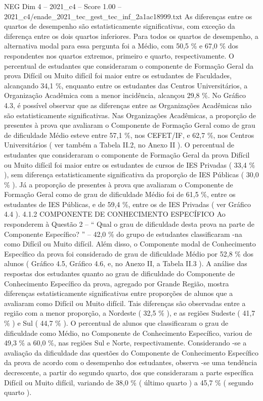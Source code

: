 \begin{textsample}{NEG Dim 4 – 2021\_c4 – Score 1.00 – 2021\_c4/enade\_2021\_tec\_gest\_tec\_inf\_2a1ac18999.txt}
As diferenças entre os quartos de desempenho são estatisticamente significativas, com exceção da diferença entre os dois quartos inferiores.
Para todos os quartos de desempenho, a alternativa modal para essa pergunta foi a Médio, com 50,5 \% e 67,0 \% dos respondentes nos quartos extremos, primeiro e quarto, respectivamente.
O percentual de estudantes que consideraram o componente de Formação Geral da prova Difícil ou Muito difícil foi maior entre os estudantes de Faculdades, alcançando 34,1 \%, enquanto entre os estudantes das Centros Universitários, a Organização Acadêmica com a menor incidência, alcançou 29,8 \%.
No Gráfico 4.3, é possível observar que as diferenças entre as Organizações Acadêmicas não são estatisticamente significativas.
Nas Organizações Acadêmicas, a proporção de presentes à prova que avaliaram o Componente de Formação Geral como de grau de dificuldade Médio esteve entre 57,1 \%, nos CEFET/IF, e 62,7 \%, nos Centros Universitários ( ver também a Tabela II.2, no Anexo II ).
O percentual de estudantes que consideraram o componente de Formação Geral da prova Difícil ou Muito difícil foi maior entre os estudantes de cursos de IES Privadas ( 33,4 \% ), sem diferença estatisticamente significativa da proporção de IES Públicas ( 30,0 \% ).
Já a proporção de presentes à prova que avaliaram o Componente de Formação Geral como de grau de dificuldade Médio foi de 61,5 \%, entre os estudantes de IES Públicas, e de 59,4 \%, entre os de IES Privadas ( ver Gráfico 4.4 ). 4.1.2 COMPONENTE DE CONHECIMENTO ESPECÍFICO Ao responderem à Questão 2 – “ Qual o grau de dificuldade desta prova na parte de Componente Específico? ” – 42,0 \% do grupo de estudantes classificaram -na como Difícil ou Muito difícil.
Além disso, o Componente modal de Conhecimento Específico da prova foi considerado de grau de dificuldade Médio por 52,8 \% dos alunos ( Gráfico 4.5, Gráfico 4.6, e, no Anexo II, a Tabela II.3 ).
A análise das respostas dos estudantes quanto ao grau de dificuldade do Componente de Conhecimento Específico da prova, agregado por Grande Região, mostra diferenças estatisticamente significativas entre proporções de alunos que a avaliaram como Difícil ou Muito difícil.
Tais diferenças são observadas entre a região com a menor proporção, a Nordeste ( 32,5 \% ), e as regiões Sudeste ( 41,7 \% ) e Sul ( 44,7 \% ).
O percentual de alunos que classificaram o grau de dificuldade como Médio, no Componente de Conhecimento Específico, variou de 49,3 \% a 60,0 \%, nas regiões Sul e Norte, respectivamente.
Considerando -se a avaliação da dificuldade das questões do Componente de Conhecimento Específico da prova de acordo com o desempenho dos estudantes, observa -se uma tendência decrescente, a partir do segundo quarto, dos que consideraram a parte específica Difícil ou Muito difícil, variando de 38,0 \% ( último quarto ) a 45,7 \% ( segundo quarto ).

\end{textsample}
